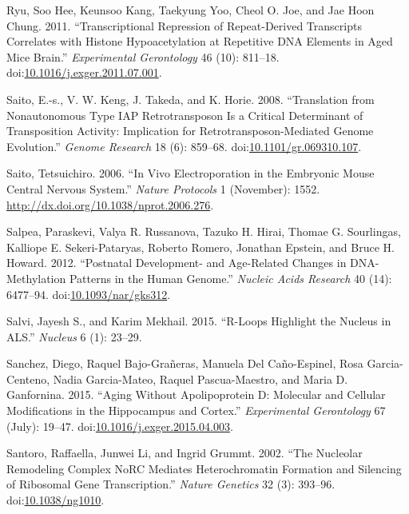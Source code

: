 \documentclass[onehalf,12pt]{beavtex}
\begin{document}
  \hypertarget{ref-RyuTranscriptionalrepressionrepeatderived2011}{}
  Ryu, Soo Hee, Keunsoo Kang, Taekyung Yoo, Cheol O. Joe, and Jae Hoon
  Chung. 2011. ``Transcriptional Repression of Repeat-Derived Transcripts
  Correlates with Histone Hypoacetylation at Repetitive DNA Elements in
  Aged Mice Brain.'' \emph{Experimental Gerontology} 46 (10): 811--18.
  doi:\href{https://doi.org/10.1016/j.exger.2011.07.001}{10.1016/j.exger.2011.07.001}.
  
  \hypertarget{ref-SaitoTranslationnonautonomoustype2008}{}
  Saito, E.-s., V. W. Keng, J. Takeda, and K. Horie. 2008. ``Translation
  from Nonautonomous Type IAP Retrotransposon Is a Critical Determinant of
  Transposition Activity: Implication for Retrotransposon-Mediated Genome
  Evolution.'' \emph{Genome Research} 18 (6): 859--68.
  doi:\href{https://doi.org/10.1101/gr.069310.107}{10.1101/gr.069310.107}.
  
  \hypertarget{ref-Saitovivoelectroporationembryonic2006a}{}
  Saito, Tetsuichiro. 2006. ``In Vivo Electroporation in the Embryonic
  Mouse Central Nervous System.'' \emph{Nature Protocols} 1 (November):
  1552. \url{http://dx.doi.org/10.1038/nprot.2006.276}.
  
  \hypertarget{ref-SalpeaPostnataldevelopmentagerelated2012}{}
  Salpea, Paraskevi, Valya R. Russanova, Tazuko H. Hirai, Thomae G.
  Sourlingas, Kalliope E. Sekeri-Pataryas, Roberto Romero, Jonathan
  Epstein, and Bruce H. Howard. 2012. ``Postnatal Development- and
  Age-Related Changes in DNA-Methylation Patterns in the Human Genome.''
  \emph{Nucleic Acids Research} 40 (14): 6477--94.
  doi:\href{https://doi.org/10.1093/nar/gks312}{10.1093/nar/gks312}.
  
  \hypertarget{ref-SalviRloopshighlightnucleus2015}{}
  Salvi, Jayesh S., and Karim Mekhail. 2015. ``R-Loops Highlight the
  Nucleus in ALS.'' \emph{Nucleus} 6 (1): 23--29.
  
  \hypertarget{ref-SanchezAgingApolipoproteinMolecular2015a}{}
  Sanchez, Diego, Raquel Bajo-Grañeras, Manuela Del Caño-Espinel, Rosa
  Garcia-Centeno, Nadia Garcia-Mateo, Raquel Pascua-Maestro, and Maria D.
  Ganfornina. 2015. ``Aging Without Apolipoprotein D: Molecular and
  Cellular Modifications in the Hippocampus and Cortex.''
  \emph{Experimental Gerontology} 67 (July): 19--47.
  doi:\href{https://doi.org/10.1016/j.exger.2015.04.003}{10.1016/j.exger.2015.04.003}.
  
  \hypertarget{ref-Santoronucleolarremodelingcomplex2002}{}
  Santoro, Raffaella, Junwei Li, and Ingrid Grummt. 2002. ``The Nucleolar
  Remodeling Complex NoRC Mediates Heterochromatin Formation and Silencing
  of Ribosomal Gene Transcription.'' \emph{Nature Genetics} 32 (3):
  393--96. doi:\href{https://doi.org/10.1038/ng1010}{10.1038/ng1010}.
  
\end{document}
